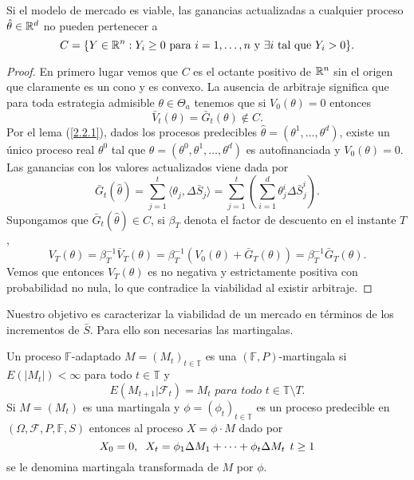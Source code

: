 \begin{lemaBox}\label{3.2.1}
	Si el modelo de mercado es viable, las ganancias actualizadas a cualquier proceso $ \hat{\theta} \in \mathbb{R} ^d $ no pueden pertenecer a 
	\[
	C = \{Y \in \mathbb{R}^n: Y_i \geq 0\text{ para } i=1,\dots,n \text{ y } \exists i \text{ tal que } Y_i > 0\}.
	\]
\end{lemaBox}
\begin{proof}
En primero lugar vemos que $ C $ es el octante positivo de $ \mathbb{R}^n $ sin el origen que claramente es un cono y es convexo. La ausencia de arbitraje significa que para toda estrategia admisible $ \theta \in \Theta_a $ tenemos que si $ V_0(\theta) = 0 $ entonces
\[
\bar{V}_t(\theta) = \bar{G}_t (\theta) \notin C.
\]
Por el lema (\ref{2.2.1}), dados los procesos predecibles $ \hat{\theta} = (\theta^1, \dots,\theta^d) $, existe un único proceso real $ \theta^0 $ tal que $ \theta = (\theta^0, \theta^1,\dots, \theta^d) $ es autofinanciada y $ V_0(\theta) = 0 $. Las ganancias con los valores actualizados viene dada por
\[
\bar{G}_t(\hat{\theta}) = \sum_{j=1}^{t} \langle \theta_j, \Delta \bar{S}_j \rangle =   \sum_{j=1}^{t} \left( \sum_{i=1}^{d} \theta_j^i \Delta \bar{S}_j^i  \right).
\]
Supongamos que $ \bar{G}_t(\hat{\theta}) \in C $, si $ \beta_T $ denota el factor de descuento en el instante $ T $,
\[
V_T(\theta) = \beta_T^{-1} \bar{V}_T(\theta) = \beta_T^{-1}(V_0 (\theta) + \bar{G}_T(\theta)) = \beta_T^{-1}\bar{G}_T(\theta).
\]
Vemos que entonces $ V_T(\theta) $ es no negativa y estrictamente positiva con probabilidad no nula, lo que contradice la viabilidad al existir arbitraje.
\end{proof}

Nuestro objetivo es caracterizar la viabilidad de un mercado en términos de los incrementos de $ \bar{S} $. Para ello son necesarias las martingalas.
\begin{definicion}
Un proceso $ \mathbb{F} $-adaptado $ M = (M_t)_{t\in \mathbb{T}} $ es una $ ( \mathbb{F},P) $-martingala si $ E(|M_t|) < \infty $ para todo $ t \in \mathbb{T} $ y 
\[
E(M_{t+1}|\mathcal{F}_t) = M_t \textit{ para todo } t \in \mathbb{T}\setminus{T}.
\]
Si $ M = (M_t) $ es una martingala y $ \phi = (\phi_t)_{t\in \mathbb{T}} $ es un proceso predecible en $ (\Omega, \mathcal{F}, P, \mathbb{F}, S) $ entonces al proceso $ X = \phi \cdot M $ dado por
\[
X_0=0, \hspace{2mm}X_t = \phi_1\Delta M_1+\cdots+ \phi_t\Delta M_t \hspace{1.5mm} t \geq1
\]
se le denomina martingala transformada de $ M $ por $ \phi $.
\end{definicion}

